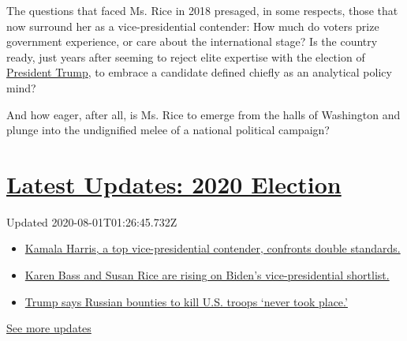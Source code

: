 The questions that faced Ms. Rice in 2018 presaged, in some respects,
those that now surround her as a vice-presidential contender: How much
do voters prize government experience, or care about the international
stage? Is the country ready, just years after seeming to reject elite
expertise with the election of
\href{https://www.nytimes.com/interactive/2020/us/elections/donald-trump.html}{President
Trump}, to embrace a candidate defined chiefly as an analytical policy
mind?

And how eager, after all, is Ms. Rice to emerge from the halls of
Washington and plunge into the undignified melee of a national political
campaign?

\hypertarget{latest-updates-2020-election}{%
\section{\texorpdfstring{\href{https://www.nytimes.com/2020/07/31/us/elections/biden-vs-trump.html?action=click\&pgtype=Article\&state=default\&region=MAIN_CONTENT_1\&context=storylines_live_updates}{Latest
Updates: 2020
Election}}{Latest Updates: 2020 Election}}\label{latest-updates-2020-election}}

Updated 2020-08-01T01:26:45.732Z

\begin{itemize}
\tightlist
\item
  \href{https://www.nytimes.com/2020/07/31/us/elections/biden-vs-trump.html?action=click\&pgtype=Article\&state=default\&region=MAIN_CONTENT_1\&context=storylines_live_updates\#link-29fdff45}{Kamala
  Harris, a top vice-presidential contender, confronts double
  standards.}
\item
  \href{https://www.nytimes.com/2020/07/31/us/elections/biden-vs-trump.html?action=click\&pgtype=Article\&state=default\&region=MAIN_CONTENT_1\&context=storylines_live_updates\#link-13ec3d9c}{Karen
  Bass and Susan Rice are rising on Biden's vice-presidential
  shortlist.}
\item
  \href{https://www.nytimes.com/2020/07/31/us/elections/biden-vs-trump.html?action=click\&pgtype=Article\&state=default\&region=MAIN_CONTENT_1\&context=storylines_live_updates\#link-49e9a016}{Trump
  says Russian bounties to kill U.S. troops `never took place.'}
\end{itemize}

\href{https://www.nytimes.com/2020/07/31/us/elections/biden-vs-trump.html?action=click\&pgtype=Article\&state=default\&region=MAIN_CONTENT_1\&context=storylines_live_updates}{See
more updates}

